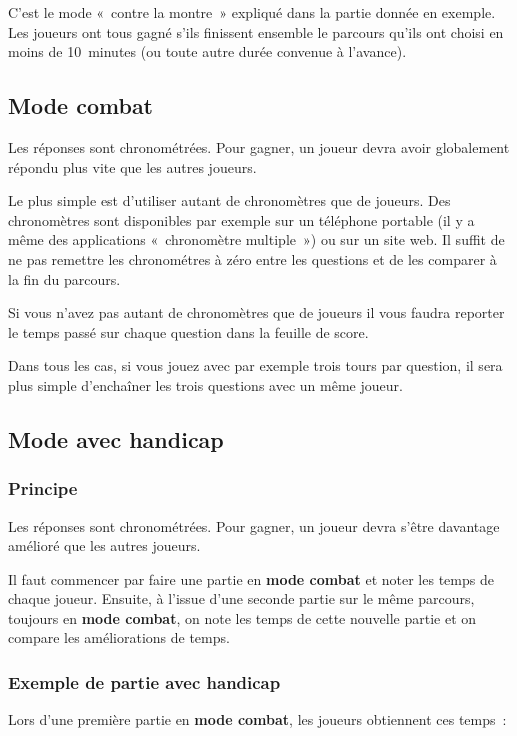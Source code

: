 \documentclass[11pt]{article}
\newcommand{\mode}[1]
{\textbf{#1}}
\begin{document}
C’est le mode « contre la montre » expliqué dans la partie donnée en exemple.
Les joueurs ont tous gagné s’ils finissent ensemble le parcours qu’ils ont
choisi en moins de 10 minutes (ou toute autre durée convenue à l’avance).

\subsection{Mode combat}

Les réponses sont chronométrées. Pour gagner, un joueur devra avoir
globalement répondu plus vite que les autres joueurs.

Le plus simple est d’utiliser autant de chronomètres que de joueurs.
Des chronomètres sont disponibles par exemple sur un téléphone portable (il y
a même des applications « chronomètre multiple ») ou sur un site web. Il suffit
de ne pas remettre les chronométres à zéro entre les questions et de les
comparer à la fin du parcours.

Si vous n’avez pas autant de chronomètres que de joueurs il vous faudra
reporter le temps passé sur chaque question dans la feuille de score.

Dans tous les cas, si vous jouez avec par exemple trois tours par question, il
sera plus simple d’enchaîner les trois questions avec un même joueur.

\subsection{Mode avec handicap}

\subsubsection{Principe}

Les réponses sont chronométrées. Pour gagner, un joueur devra s’être davantage
amélioré que les autres joueurs.

Il faut commencer par faire une partie en \mode{mode combat} et noter les temps
de chaque joueur. Ensuite, à l’issue d’une seconde partie sur le même parcours,
toujours en \mode{mode combat}, on note les temps de cette nouvelle partie et
on compare les améliorations de temps.

\subsubsection{Exemple de partie avec handicap}

Lors d’une première partie en \mode{mode combat}, les joueurs obtiennent ces
temps :
\end{document}
